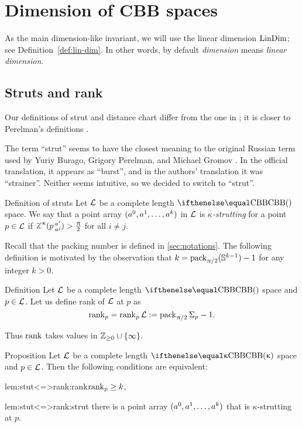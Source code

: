 \chapter{Dimension of CBB spaces}

As the main dimension-like invariant, we will use the linear dimension $\mathop{\rm LinDim}\nolimits$; 
see Definition~\ref{def:lin-dim}. In other words, by default {}\emph{dimension} means {}\emph{linear dimension}. 

\section{Struts and rank}\label{sec:struts+rank}

Our definitions of strut 
and distance chart 
differ from the one in \cite{burago-gromov-perelman};
it is closer to Perelman's definitions \cite{perelman:spaces2,perelman:morse}.

The term ``strut'' seems to have the closest meaning to the original Russian term used by Yuriy Burago, Grigory Perelman, and Michael Gromov \cite{burago-gromov-perelman}.
In the official translation,
it appears as ``burst'', 
and in the authors' translation it was ``strainer''.
Neither seems intuitive, 
so we decided to switch to ``strut''.

\begin{thm}{Definition of struts}\label{def:strut-I}
Let $\mathcal{L}$ be a complete length $\Alex{}$ space.
We say that a point array $(a^0,a^1,\dots,a^\kay)$ in $\mathcal{L}$
 is \emph{$\kappa$-strutting} for a point $p\in\spc{L}$ if $\angk\kappa p {a^i}{a^j}>\tfrac\pi2$ for all $i\ne j$.
\end{thm} 

Recall that the packing number is defined in \ref{sec:notations}.
The following definition is motivated by the observation that $k\z=\pack_{\pi/2}(\SS^{k-1})-1$ for any integer $k>0$. 

\begin{thm}{Definition}\label{def:rank}
Let $\mathcal{L}$ be a complete length $\Alex{}$ space
and $p\in \spc{L}$.
Let us define rank of $\mathcal{L}$ at $p$ as 
\[\mathop{\rm rank}\nolimits_p=\mathop{\rm rank}\nolimits_p\mathcal{L}
:=
\mathop{\rm pack}\nolimits_{\uppi/2}\Sigma_p-1.\]

\end{thm}

Thus $\mathop{\rm rank}\nolimits$ takes values in $\ZZ_{\ge0}\cup\{\infty\}$.

\begin{thm}{Proposition}\label{prop:stutt}
Let $\mathcal{L}$ be a complete length $\Alex{\kappa}$ space 
and $p\in \spc{L}$.
Then the following conditions are equivalent:

\begin{subthm}{lem:stut<=>rank:rank}$\rank_p\ge\kay$,
\end{subthm}

\begin{subthm}{lem:stut<=>rank:strut}
there is a point array $(a^0,a^1,\dots,a^\kay)$
that is $\kappa$-strutting at $p$. 
\end{subthm}
\end{thm}

